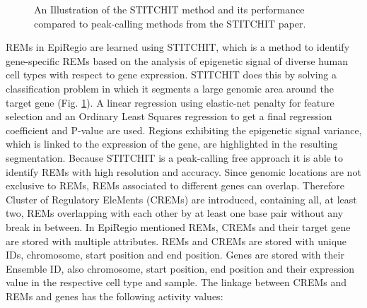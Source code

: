 \documentclass[pdftex,12pt,a4paper]{report}
\begin{document}
\begin{figure}[!ht]
\begin{center}
	\caption{An Illustration of the STITCHIT method and its performance compared to peak-calling methods from the STITCHIT paper\cite{stitchit}.}
	\label{stitchit}
\end{center}
\end{figure}
REMs in EpiRegio are learned using STITCHIT\cite{stitchit}, which is a method to identify gene-specific REMs based on the analysis of epigenetic signal of diverse human cell types with respect to gene expression. STITCHIT does this by solving a classification problem in which it segments a large genomic area around the target gene (Fig. \ref{stitchit}). A linear regression using elastic-net penalty for feature selection and an Ordinary Least Squares regression to get a final regression coefficient and P-value are used. Regions exhibiting the epigenetic signal variance, which is linked to the expression of the gene, are highlighted in the resulting segmentation. Because STITCHIT is a peak-calling free approach it is able to identify REMs with high resolution and accuracy. Since genomic locations are not exclusive to REMs, REMs associated to different genes can overlap. Therefore Cluster of Regulatory EleMents (CREMs) are introduced, containing all, at least two, REMs overlapping with each other by at least one base pair without any break in between. 
In EpiRegio mentioned REMs, CREMs and their target gene are stored with multiple attributes. REMs and CREMs are stored with unique IDs, chromosome, start position and end position. Genes are stored with their Ensemble ID, also chromosome, start position, end position and their expression value in the respective cell type and sample. The linkage between CREMs and REMs and genes has the following activity values:
\end{document}
